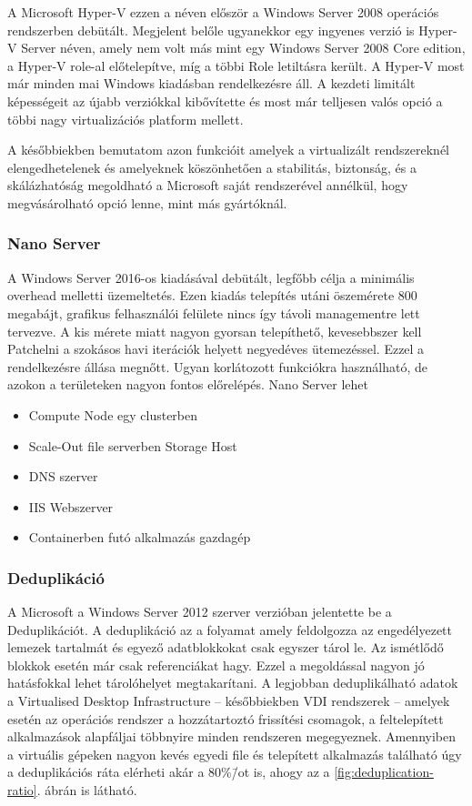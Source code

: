 \documentclass[12pt,oneside,justify]{book}
\begin{document}
A Microsoft Hyper-V ezzen a néven először a Windows Server 2008 operációs rendszerben debütált. 
Megjelent belőle ugyanekkor egy ingyenes verzió is Hyper-V Server néven, amely nem volt más mint egy Windows Server 2008 Core edition, a Hyper-V role-al előtelepítve, míg a többi Role letiltásra került.
A Hyper-V most már minden mai Windows kiadásban rendelkezésre áll. A kezdeti limitált képességeit az újabb verziókkal kibővítette és most már telljesen valós opció a többi nagy virtualizációs platform mellett. 

A későbbiekben bemutatom azon funkcióit amelyek a virtualizált rendszereknél elengedhetelenek és amelyeknek köszönhetően a stabilitás, biztonság, és a skálázhatóság megoldható a Microsoft saját rendszerével annélkül, hogy megvásárolható opció lenne, mint más gyártóknál.

\subsubsection{Nano Server}

A Windows Server 2016-os kiadásával debütált, legfőbb célja a minimális overhead melletti üzemeltetés. 
Ezen kiadás telepítés utáni öszemérete 800 megabájt, grafikus felhasználói felülete nincs így távoli managementre lett tervezve.
A kis mérete miatt nagyon gyorsan telepíthető, kevesebbszer kell Patchelni a szokásos havi iterációk helyett negyedéves ütemezéssel. 
Ezzel a rendelkezésre állása megnőtt. 
Ugyan korlátozott funkciókra használható, de azokon a területeken nagyon fontos előrelépés. 
Nano Server lehet 
\begin{itemize}
	\item Compute Node egy clusterben
	\item Scale-Out file serverben Storage Host
	\item DNS szerver
	\item IIS Webszerver
	\item Containerben futó alkalmazás gazdagép
\end{itemize}

\subsubsection{Deduplikáció}

A Microsoft a Windows Server 2012 szerver verzióban jelentette be a Deduplikációt. 
A deduplikáció az a folyamat amely feldolgozza az engedélyezett lemezek tartalmát és egyező adatblokkokat csak egyszer tárol le. Az ismétlődő blokkok esetén már csak referenciákat hagy. 
Ezzel a megoldással nagyon jó hatásfokkal lehet tárolóhelyet megtakarítani. 
A legjobban deduplikálható adatok a Virtualised Desktop Infrastructure -- későbbiekben VDI rendszerek -- amelyek esetén az operációs rendszer a hozzátartoztó frissítési csomagok, a feltelepített alkalmazások alapfáljai többnyire minden rendszeren megegyeznek. 
Amennyiben a virtuális gépeken nagyon kevés egyedi file és telepített alkalmazás található úgy a deduplikációs ráta elérheti akár a 80\%\=/ot is, ahogy az a \ref{fig:deduplication-ratio}. ábrán is látható.
\end{document}
